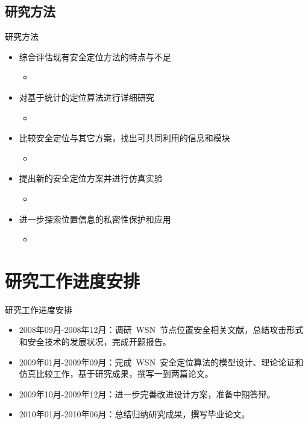 \documentclass[mathserif,compress,CJKutf8, red]{beamer}
\newcommand{\xiaowuhao}{\fontsize{9pt}{\baselineskip}\selectfont}   %
\begin{document}
\begin{CJK*}{UTF8}{song}
\subsection{研究方法}
\begin{frame}{研究方法}
\begin{itemize}
\item 综合评估现有安全定位方法的特点与不足
\begin{itemize}
\item \xiaowuhao{从抵御的攻击类型、硬件要求、定位精确度、算法复杂度、通信开销、可扩展性等几个方面对它们进行比较分析。}
\end{itemize}
\item 对基于统计的定位算法进行详细研究
\begin{itemize}
\item \xiaowuhao{探索每个统计模型适用范围和对错误数据的容忍程度，寻找更健壮的统计模型。}
\end{itemize}
\item 比较安全定位与其它方案，找出可共同利用的信息和模块
\begin{itemize}
\item \xiaowuhao{研究安全定位与密钥管理、数据融合、安全路由等安全方案，从算法、协议等处寻找可共同利用的部分。}
\end{itemize}
\item 提出新的安全定位方案并进行仿真实验
\begin{itemize}
\item \xiaowuhao{以提高定位算法的安全性和健壮性、降低算法和协议的复杂度为目的，构造新的安全定位方案并进行仿真。}
\end{itemize}
\item 进一步探索位置信息的私密性保护和应用
\begin{itemize}
\item \xiaowuhao{分析已有方案中各部分保护效果和开销，寻找减轻通信开销的替代方法；评价位置信息能否使其它方案产生更优的结果。}
\end{itemize}
\end{itemize}
\end{frame}

\section{研究工作进度安排}

\begin{frame}{研究工作进度安排}
\begin{itemize}
\item 2008年09月-2008年12月：调研~WSN~节点位置安全相关文献，总结攻击形式和安全技术的发展状况，完成开题报告。
\item 2009年01月-2009年09月：完成~WSN~安全定位算法的模型设计、理论论证和仿真比较工作，基于研究成果，撰写一到两篇论文。
\item 2009年10月-2009年12月：进一步完善改进设计方案，准备中期答辩。
\item 2010年01月-2010年06月：总结归纳研究成果，撰写毕业论文。
\end{itemize}


\end{frame}
\end{CJK*}
\end{document}
